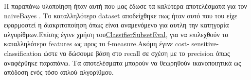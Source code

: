 Η παραπάνω υλοποίηση ήταν αυτή που μας έδωσε τα καλύτερα αποτελέσματα για τον naiveBayes .
Το καταλληλότερο  dataset αποδείχθηκε πως ήταν αυτό που του είχε εφαρμοστεί η διακριτοποίηση   όπως είναι 
αναμενόμενο για αυτλη την κατηγορία αλγορίθμων.Επίσης έγινε χρήση 
του\href{http://weka.sourceforge.net/doc.stable/weka/attributeSelection/ClassifierSubsetEval.html}
{ClassifierSubsetEval},  για να επιλεχθούν τα καταλληλότερα features ως προς το f-measure.Ακόμη έγινε cost-
sensitive-classification ώστε να δώσουμε βάση στο recall σε σχέση με το precision όπως αναφέρθηκε παραπάνω.
Τα αποτελέσματα μπορούν να θεωρηθούν ικανοποιητικά ως απόδοση ενός τόσο απλού αλγορίθμου.